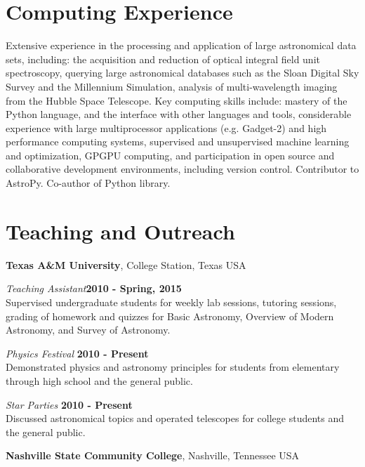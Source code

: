 \documentclass[margin,line, 11pt]{res}
\begin{document}
\begin{resume}
\section{Computing Experience}
Extensive experience in the processing and application of large astronomical data sets, including: the acquisition and reduction of optical integral field unit spectroscopy, querying large astronomical databases such as the Sloan Digital Sky Survey and the Millennium Simulation, analysis of multi-wavelength imaging from the Hubble Space Telescope. Key computing skills include: mastery of the Python language, and the interface with other languages and tools, considerable experience with large multiprocessor applications (e.g. Gadget-2) and high performance computing systems, supervised and unsupervised machine learning and optimization, GPGPU computing, and participation in open source and collaborative development environments, including version control. Contributor to {\sc AstroPy}. Co-author of \href{http://astlib.sourceforge.net/}{} Python library.
\vspace*{-3mm}

\section{Teaching and Outreach}
\textbf{Texas A\&M University}, College Station, Texas USA
\vspace{-3mm}

\emph{Teaching Assistant}\hfill \textbf{2010 - Spring, 2015}\\
Supervised undergraduate students for weekly lab sessions, tutoring sessions, grading of homework and quizzes for Basic Astronomy, Overview of Modern Astronomy, and Survey of Astronomy.
\vspace*{-3mm}

\emph{Physics Festival} \hfill \textbf{2010 - Present}\\
Demonstrated physics and astronomy principles for students from elementary through high school and the general public.
\vspace*{-3mm}

\emph{Star Parties} \hfill \textbf{2010 - Present}\\
Discussed astronomical topics and operated telescopes for college students and the general public.

\textbf{Nashville State Community College}, Nashville, Tennessee USA
\vspace{-3mm}


\end{resume}
\end{document}
